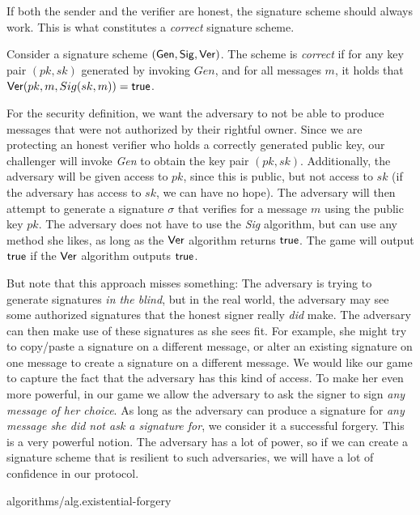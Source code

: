 If both the sender and the verifier are honest, the signature scheme should always
work. This is what constitutes a \emph{correct} signature scheme.

\begin{definition}
  Consider a signature scheme $(\mathsf{Gen}, \mathsf{Sig}, \mathsf{Ver})$. The scheme is \emph{correct} if
  for any key pair $(pk, sk)$ generated by invoking $Gen$, and
  for all messages $m$, it holds that $\mathsf{Ver}(pk, m, Sig(sk, m)) = \textsf{true}$.
\end{definition}

For the security definition, we want the adversary to not be able to produce
messages that were not authorized by their rightful owner. Since we are protecting
an honest verifier who holds a correctly generated public key, our challenger will
invoke \emph{Gen} to obtain the key pair $(pk, sk)$. Additionally, the adversary will
be given access to $pk$, since this is public, but not access to $sk$ (if the adversary
has access to $sk$, we can have no hope). The adversary will then attempt to generate
a signature $\sigma$ that verifies for a message $m$ using the public key $pk$.
The adversary does not have to use the \emph{Sig} algorithm, but can use any method
she likes, as long as the $\mathsf{Ver}$ algorithm returns $\textsf{true}$. The game will output
$\textsf{true}$ if the $\mathsf{Ver}$ algorithm outputs $\textsf{true}$.

But note that this approach misses something: The adversary is trying to generate
signatures \emph{in the blind}, but in the real world, the adversary may see some
authorized signatures that the honest signer really \emph{did} make. The adversary
can then make use of these signatures as she sees fit. For example, she might try
to copy/paste a signature on a different message, or alter an existing signature
on one message to create a signature on a different message. We would like our
game to capture the fact that the adversary has this kind of access. To make her
even more powerful, in our game we allow the adversary to ask the signer to sign
\emph{any message of her choice}. As long as the adversary can produce a signature
for \emph{any message she did not ask a signature for}, we consider it a successful
forgery. This is a very powerful notion. The adversary has a lot of power, so if
we can create a signature scheme that is resilient to such adversaries, we will have
a lot of confidence in our protocol.

{algorithms/alg.existential-forgery}

